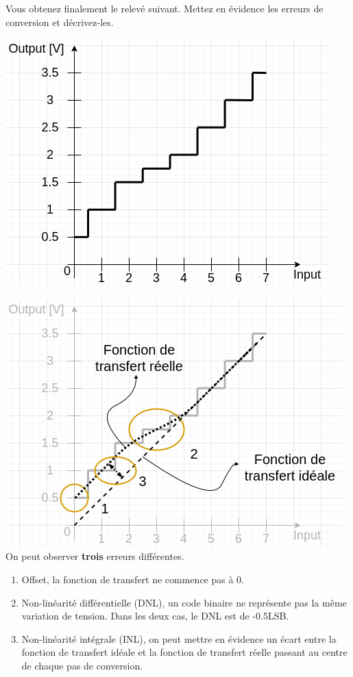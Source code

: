 \documentclass{exam}
\begin{document}
{
Vous obtenez finalement le relevé suivant. 
Mettez en évidence les erreurs de conversion et décrivez-les.
\begin{flushleft}
	\includegraphics[width=.35\paperwidth]{erreur-conversion.png}
\end{flushleft}
}
{
	\includegraphics[width=.4\paperwidth]{erreur-conversion_correction.png}
	On peut observer \textbf{trois} erreurs différentes.
	\begin{enumerate}
		\item Offset, la fonction de transfert ne commence pas à 0.
		\item Non-linéarité différentielle (DNL), un code binaire ne représente pas la même variation de tension. Dans les deux cas, le DNL est de -0.5LSB.
		\item Non-linéarité intégrale (INL), on peut mettre en évidence un écart entre la fonction de transfert idéale et la fonction de transfert réelle passant au centre de chaque pas de conversion.
	\end{enumerate}
}
\end{document}

